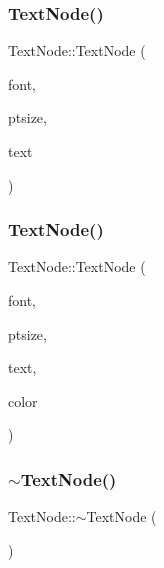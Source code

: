 \mbox{\label{classsage_1_1TextNode_a9988fa03958e378b3fd612ea3a103649}} 
\subsubsection{\texorpdfstring{TextNode()}{TextNode()}\hspace{0.1cm}{\footnotesize\ttfamily [2/3]}}
{\footnotesize\ttfamily Text\+Node\+::\+Text\+Node (\begin{DoxyParamCaption}\item[{const std\+::string \&}]{font,  }\item[{int}]{ptsize,  }\item[{const std\+::string \&}]{text }\end{DoxyParamCaption})}

\mbox{\label{classsage_1_1TextNode_a5677717ec6c2db9e311a40ad1510adb9}} 
\subsubsection{\texorpdfstring{TextNode()}{TextNode()}\hspace{0.1cm}{\footnotesize\ttfamily [3/3]}}
{\footnotesize\ttfamily Text\+Node\+::\+Text\+Node (\begin{DoxyParamCaption}\item[{const std\+::string \&}]{font,  }\item[{int}]{ptsize,  }\item[{const std\+::string \&}]{text,  }\item[{S\+D\+L\+\_\+\+Color}]{color }\end{DoxyParamCaption})}

\mbox{\label{classsage_1_1TextNode_a3ad8241316536959f2727a0abb8dc3e7}} 
\subsubsection{\texorpdfstring{$\sim$TextNode()}{~TextNode()}}
{\footnotesize\ttfamily Text\+Node\+::$\sim$\+Text\+Node (\begin{DoxyParamCaption}{ }\end{DoxyParamCaption})}



